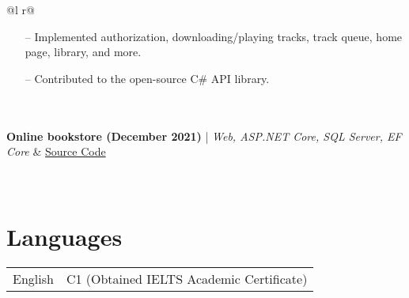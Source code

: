 \documentclass[a4paper,12pt]{article}
\begin{document}
\begin{tabularx}{\linewidth}{ @{}l r@{} }
{\begin{minipage}[t]{\linewidth}
\begin{itemize}[nosep,after=\strut, leftmargin=1em, itemsep=3pt]
        \item[--] Implemented authorization, downloading/playing tracks, track queue, home page, library, and more.
        \item [--] Contributed to the open-source C\# API library.
    \end{itemize}
    \end{minipage}
}  \\
\\
\textbf{Online bookstore (December 2021)} | \emph{Web, ASP.NET Core, SQL Server, EF Core} & \hfill \href{https://github.com/andude10/The-Tome/}{Source Code} \\[3.75pt]
  \\
\\
\end{tabularx}

\section{Languages}

\begin{tabularx}{\linewidth}{@{}l X@{}}
English  &  \normalsize{C1 (Obtained IELTS Academic Certificate)}\\
\end{tabularx}

\vfill
{}
\end{document}
